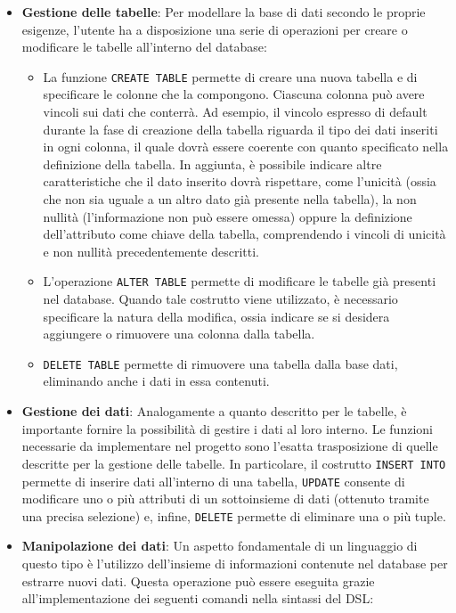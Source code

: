 \documentclass[12pt,a4paper,openright,twoside]{book}
\begin{document}
\begin{itemize}
    \item \textbf{Gestione delle tabelle}: Per modellare la base di dati secondo le proprie esigenze, l’utente ha a disposizione una serie 
    di operazioni per creare o modificare le tabelle all’interno del database:

    \begin{itemize}
        \item La funzione \texttt{CREATE TABLE} permette di creare una nuova tabella e di specificare le colonne che la compongono. Ciascuna 
        colonna può avere vincoli sui dati che conterrà. Ad esempio, il vincolo espresso di default durante la fase di creazione della 
        tabella riguarda il tipo dei dati inseriti in ogni colonna, il quale dovrà essere coerente con quanto specificato nella definizione 
        della tabella. In aggiunta, è possibile indicare altre caratteristiche che il dato inserito dovrà rispettare, come l’unicità (ossia 
        che non sia uguale a un altro dato già presente nella tabella), la non nullità (l’informazione non può essere omessa) oppure la 
        definizione dell’attributo come chiave della tabella, comprendendo i vincoli di unicità e non nullità precedentemente descritti.
        \item L’operazione \texttt{ALTER TABLE} permette di modificare le tabelle già presenti nel database. Quando tale costrutto viene 
        utilizzato, è necessario specificare la natura della modifica, ossia indicare se si desidera aggiungere o rimuovere una colonna 
        dalla tabella.
        \item \texttt{DELETE TABLE} permette di rimuovere una tabella dalla base dati, eliminando anche i dati in essa contenuti.
    \end{itemize}

    \item \textbf{Gestione dei dati}: Analogamente a quanto descritto per le tabelle, è importante fornire la possibilità di gestire i dati 
    al loro interno. Le funzioni necessarie da implementare nel progetto sono l’esatta trasposizione di quelle descritte per la gestione 
    delle tabelle. In particolare, il costrutto \texttt{INSERT INTO} permette di inserire dati all’interno di una tabella, \texttt{UPDATE} 
    consente di modificare uno o più attributi di un sottoinsieme di dati (ottenuto tramite una precisa selezione) e, infine, \texttt{DELETE} 
    permette di eliminare una o più tuple.

    \item \textbf{Manipolazione dei dati}: Un aspetto fondamentale di un linguaggio di questo tipo è l’utilizzo dell’insieme di 
    informazioni contenute nel database per estrarre nuovi dati. Questa operazione può essere eseguita grazie all’implementazione dei 
    seguenti comandi nella sintassi del \ac{DSL}:


\end{itemize}
\end{document}
